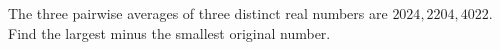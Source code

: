 The three pairwise averages of three distinct real numbers are $2024,2204,4022$. Find the largest minus the smallest original number.
